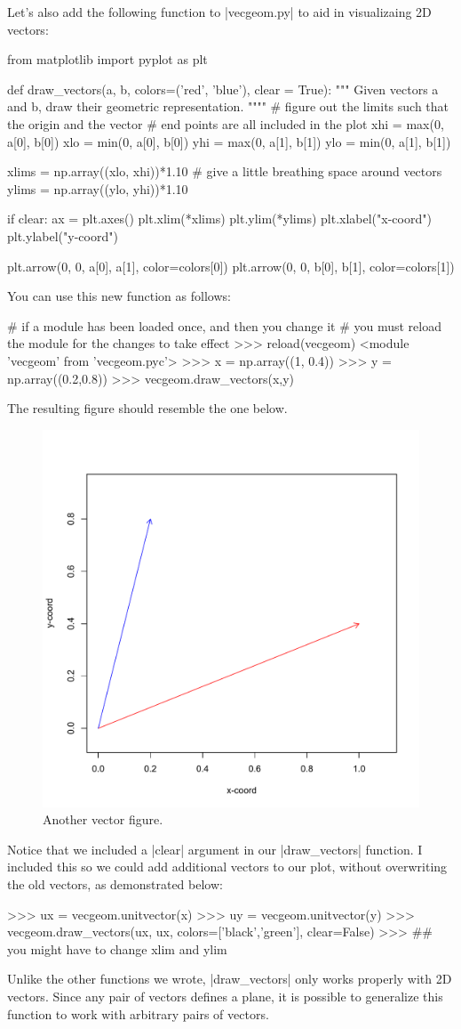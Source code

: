 Let's also add the following function to |vecgeom.py| to aid in visualizaing 2D vectors:
%
\begin{python}

from matplotlib import pyplot as plt

def draw_vectors(a, b, colors=('red', 'blue'), clear = True):
    """ Given vectors a and b, draw their geometric representation. """"
    # figure out the limits such that the origin and the vector
    # end points are all included in the plot
    xhi = max(0, a[0], b[0])
    xlo = min(0, a[0], b[0])
    yhi = max(0, a[1], b[1])
    ylo = min(0, a[1], b[1])

    xlims = np.array((xlo, xhi))*1.10 # give a little breathing space around vectors
    ylims = np.array((ylo, yhi))*1.10

    if clear:
        ax = plt.axes()
        plt.xlim(*xlims)
        plt.ylim(*ylims)
        plt.xlabel("x-coord")
        plt.ylabel("y-coord")

    plt.arrow(0, 0, a[0], a[1], color=colors[0])
    plt.arrow(0, 0, b[0], b[1], color=colors[1])

\end{python}
%
You can use this new function as follows:
\begin{python}
# if a module has been loaded once, and then you change it
# you must reload the module for the changes to take effect
>>> reload(vecgeom)  
<module 'vecgeom' from 'vecgeom.pyc'>
>>> x = np.array((1, 0.4))
>>> y = np.array((0.2,0.8))
>>> vecgeom.draw_vectors(x,y)
\end{python}
%
The resulting figure should resemble the one below.
%
\begin{figure}[htbp]
\centering
\includegraphics[width=0.33\columnwidth]{./figures/hands-on2/vecfig2.pdf}
\caption{Another vector figure.}
\end{figure}

Notice that we included a |clear| argument in our |draw_vectors| function. I included this so we could add additional vectors to our plot, without overwriting the old vectors, as demonstrated below:
\begin{python}
>>> ux = vecgeom.unitvector(x)
>>> uy = vecgeom.unitvector(y)
>>> vecgeom.draw_vectors(ux, ux, colors=['black','green'], clear=False)
>>> ## you might have to change xlim and ylim
\end{python}
%
Unlike the other functions we wrote, |draw_vectors| only works properly with 2D vectors. Since any pair of vectors defines a plane, it is possible to generalize this function to work with arbitrary pairs of vectors.


